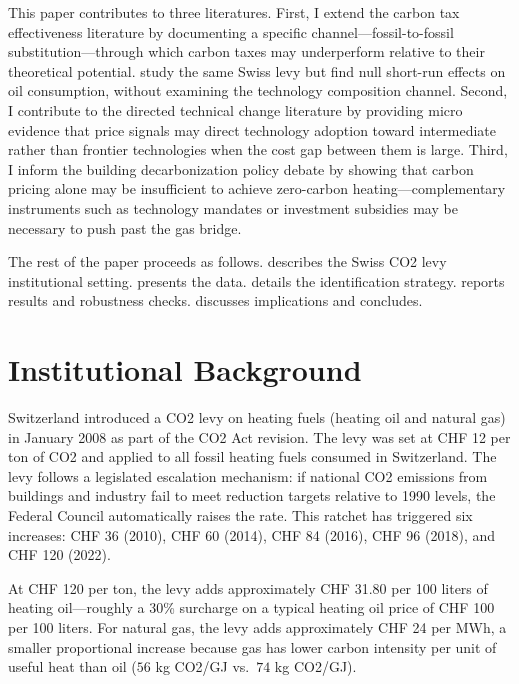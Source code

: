 \documentclass[12pt]{article}
\begin{document}
This paper contributes to three literatures. First, I extend the carbon tax effectiveness literature \citep{andersson2019, sterner2012, metcalf2019} by documenting a specific channel---fossil-to-fossil substitution---through which carbon taxes may underperform relative to their theoretical potential. \citet{cattaneo2022} study the same Swiss levy but find null short-run effects on oil consumption, without examining the technology composition channel. Second, I contribute to the directed technical change literature \citep{acemoglu2012, aghion2016} by providing micro evidence that price signals may direct technology adoption toward intermediate rather than frontier technologies when the cost gap between them is large. Third, I inform the building decarbonization policy debate \citep{jacobsen2023} by showing that carbon pricing alone may be insufficient to achieve zero-carbon heating---complementary instruments such as technology mandates or investment subsidies may be necessary to push past the gas bridge.

The rest of the paper proceeds as follows.  describes the Swiss CO2 levy institutional setting.  presents the data.  details the identification strategy.  reports results and robustness checks.  discusses implications and concludes.


\section{Institutional Background}
\label{sec:background}

Switzerland introduced a CO2 levy on heating fuels (heating oil and natural gas) in January 2008 as part of the CO2 Act revision. The levy was set at CHF 12 per ton of CO2 and applied to all fossil heating fuels consumed in Switzerland. The levy follows a legislated escalation mechanism: if national CO2 emissions from buildings and industry fail to meet reduction targets relative to 1990 levels, the Federal Council automatically raises the rate. This ratchet has triggered six increases: CHF 36 (2010), CHF 60 (2014), CHF 84 (2016), CHF 96 (2018), and CHF 120 (2022).

At CHF 120 per ton, the levy adds approximately CHF 31.80 per 100 liters of heating oil---roughly a 30\% surcharge on a typical heating oil price of CHF 100 per 100 liters. For natural gas, the levy adds approximately CHF 24 per MWh, a smaller proportional increase because gas has lower carbon intensity per unit of useful heat than oil ($56$ kg CO2/GJ vs.\ $74$ kg CO2/GJ).
\end{document}

